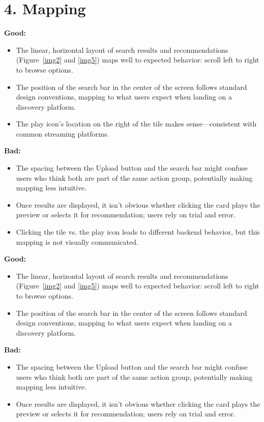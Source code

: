 \documentclass[12pt]{article}
\begin{document}
\section*{4. Mapping}

\textbf{Good:}
\begin{itemize}
    \item The linear, horizontal layout of search results and recommendations (Figure~\ref{img2} and \ref{img5}) maps well to expected behavior: scroll left to right to browse options.
    \item The position of the search bar in the center of the screen follows standard design conventions, mapping to what users expect when landing on a discovery platform.
    \item The play icon’s location on the right of the tile makes sense—consistent with common streaming platforms.
\end{itemize}

\textbf{Bad:}
\begin{itemize}
    \item The spacing between the Upload button and the search bar might confuse users who think both are part of the same action group, potentially making mapping less intuitive.
    \item Once results are displayed, it isn’t obvious whether clicking the card plays the preview or selects it for recommendation; users rely on trial and error.
    \item Clicking the tile vs. the play icon leads to different backend behavior, but this mapping is not visually communicated.
\end{itemize}


\textbf{Good:}
\begin{itemize}
    \item The linear, horizontal layout of search results and recommendations (Figure~\ref{img2} and \ref{img5}) maps well to expected behavior: scroll left to right to browse options.
    \item The position of the search bar in the center of the screen follows standard design conventions, mapping to what users expect when landing on a discovery platform.
\end{itemize}

\textbf{Bad:}
\begin{itemize}
    \item The spacing between the Upload button and the search bar might confuse users who think both are part of the same action group, potentially making mapping less intuitive.
    \item Once results are displayed, it isn’t obvious whether clicking the card plays the preview or selects it for recommendation; users rely on trial and error.
\end{itemize}
\end{document}
